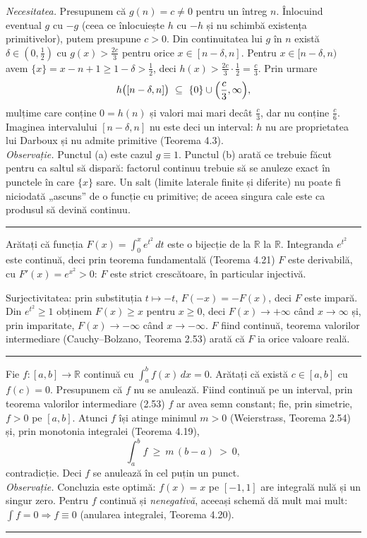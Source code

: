 \emph{Necesitatea.} Presupunem că $g(n)=c\neq0$ pentru un întreg $n$. Înlocuind eventual $g$ cu $-g$ (ceea ce înlocuiește $h$ cu $-h$ și nu schimbă existența primitivelor), putem presupune $c>0$. Din continuitatea lui $g$ în $n$ există $\delta\in\left(0,\frac12\right)$ cu $g(x)>\frac{2c}{3}$ pentru orice $x\in[n-\delta,n]$. Pentru $x\in[n-\delta,n)$ avem $\{x\}=x-n+1\ge1-\delta>\frac12$, deci $h(x)>\frac{2c}{3}\cdot\frac12=\frac c3$. Prin urmare
\[ h\bigl([n-\delta,n]\bigr)\ \subseteq\ \{0\}\cup\Bigl(\frac c3,\infty\Bigr) , \]
mulțime care conține $0=h(n)$ și valori mai mari decât $\frac c3$, dar nu conține $\frac c6$. Imaginea intervalului $[n-\delta,n]$ nu este deci un interval: $h$ nu are proprietatea lui Darboux și nu admite primitive (Teorema 4.3).\\[2pt]
\emph{Observație.} Punctul (a) este cazul $g\equiv1$. Punctul (b) arată ce trebuie făcut pentru ca saltul să dispară: factorul continuu trebuie să se anuleze exact în punctele în care $\{x\}$ sare. Un salt (limite laterale finite și diferite) nu poate fi niciodată „ascuns'' de o funcție cu primitive; de aceea singura cale este ca produsul să devină continuu.
\vspace{1mm}\hrule

Arătați că funcția $F(x)=\displaystyle\int_0^x e^{t^2}\,dt$ este o bijecție de la $\mathbb{R}$ la $\mathbb{R}$.
\sol Integranda $e^{t^2}$ este continuă, deci prin teorema fundamentală (Teorema 4.21) $F$ este derivabilă, cu $F'(x)=e^{x^2}>0$: $F$ este strict crescătoare, în particular injectivă.

Surjectivitatea: prin substituția $t\mapsto-t$, $F(-x)=-F(x)$, deci $F$ este impară. Din $e^{t^2}\ge1$ obținem $F(x)\ge x$ pentru $x\ge0$, deci $F(x)\to+\infty$ când $x\to\infty$ și, prin imparitate, $F(x)\to-\infty$ când $x\to-\infty$. $F$ fiind continuă, teorema valorilor intermediare (Cauchy--Bolzano, Teorema 2.53) arată că $F$ ia orice valoare reală.
\vspace{1mm}\hrule

Fie $f:[a,b]\to\mathbb{R}$ continuă cu $\displaystyle\int_a^bf(x)\,dx=0$. Arătați că există $c\in[a,b]$ cu $f(c)=0$.
\sol Presupunem că $f$ nu se anulează. Fiind continuă pe un interval, prin teorema valorilor intermediare (2.53) $f$ ar avea semn constant; fie, prin simetrie, $f>0$ pe $[a,b]$. Atunci $f$ își atinge minimul $m>0$ (Weierstrass, Teorema 2.54) și, prin monotonia integralei (Teorema 4.19),
\[ \int_a^bf\ \ge\ m\,(b-a)\ >\ 0 , \]
contradicție. Deci $f$ se anulează în cel puțin un punct.\\[2pt]
\emph{Observație.} Concluzia este optimă: $f(x)=x$ pe $[-1,1]$ are integrală nulă și un singur zero. Pentru $f$ continuă și \emph{nenegativă}, aceeași schemă dă mult mai mult: $\int f=0\Rightarrow f\equiv0$ (anularea integralei, Teorema 4.20).
\vspace{1mm}\hrule

